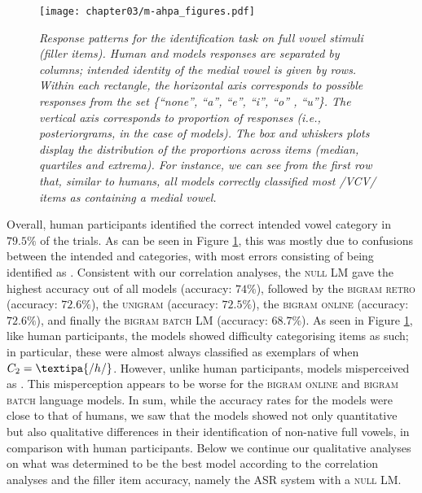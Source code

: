 {\begin{figure}[htb]
\centering
\texttt{[image: chapter03/m-ahpa\_figures.pdf]}
\caption{\textit{Response patterns for the identification task on full vowel stimuli (filler items). Human and models responses are separated by columns; intended identity of the medial vowel is given by rows. Within each rectangle, the horizontal axis corresponds to possible responses from the set \{``none'', ``a'', ``e'', ``i'', ``o'' , ``u''\}. The vertical axis corresponds to proportion of responses (i.e., posteriorgrams, in the case of models). The box and whiskers plots display the distribution of the proportions across items (median, quartiles and extrema). For instance, we can see from the first row that, similar to humans, all models correctly classified most /VCV/ items as containing a medial  vowel.}}
\label{fig:m-ahpa_fV_acc}
\end{figure}


Overall, human participants identified the correct intended vowel category in $79.5\%$ of the trials. As can be seen in Figure \ref{fig:m-ahpa_fV_acc}, this was mostly due to confusions between the intended  and  categories, with most errors consisting of  being identified as .
Consistent with our correlation analyses, the \textsc{null} LM gave the highest accuracy out of all models (accuracy: $74\%$), followed by the \textsc{bigram retro} (accuracy: $72.6\%$), the \textsc{unigram} (accuracy: $72.5\%$), the \textsc{bigram online} (accuracy: $72.6\%$), and finally the \textsc{bigram batch} LM (accuracy: $68.7\%$). 
As seen in Figure \ref{fig:m-ahpa_fV_acc}, like human participants, the models showed difficulty categorising  items as such; in particular, these were almost always classified as exemplars of  when $C_2 = \textipa{/h/}$. However, unlike human participants, models misperceived  as . This misperception appears to be worse for the \textsc{bigram online} and \textsc{bigram batch} language models.
In sum, while the accuracy rates for the models were close to that of humans, we saw that the models showed not only quantitative but also qualitative differences in their identification of non-native full vowels, in comparison with human participants. Below we continue our qualitative analyses on what was determined to be the best model according to the correlation analyses and the filler item accuracy, namely the ASR system with a \textsc{null} LM.  

}
